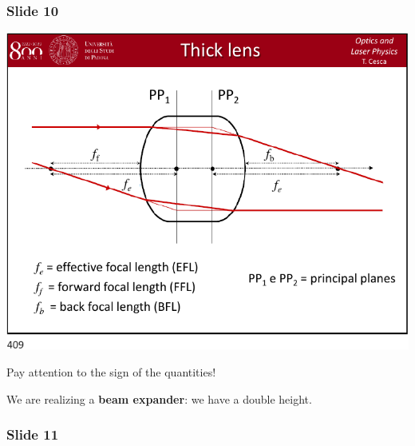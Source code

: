 \documentclass[../main/main.tex]{subfiles}
\begin{document}
\subsubsection*{Slide 10}

\begin{minipage}[]{0.5\linewidth}
\centering
\includegraphics[page=10,width=1\textwidth]{../lessons/pdf_file/20_lecture.pdf}
\end{minipage}
\hspace{0.3cm}\vspace{0.3cm}
\begin{minipage}[c]{0.47\linewidth}

Pay attention to the sign of the quantities!

We are realizing a \textbf{beam expander}: we have a double height.

\end{minipage}

\subsubsection*{Slide 11}
\end{document}
